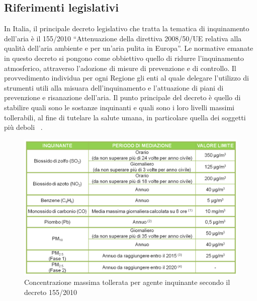 \subsection{Riferimenti legislativi}
In Italia, il principale decreto legislativo che tratta la tematica di inquinamento dell'aria è il 155/2010 “Attenuazione della direttiva 2008/50/UE relativa alla qualità dell'aria ambiente e per un'aria pulita in Europa”.
Le normative emanate in questo decreto si pongono come obbiettivo quello di ridurre l'inquinamento atmosferico, attraverso l'adozione di misure di prevenzione e di controllo.
Il provvedimento individua per ogni Regione gli enti al quale delegare l'utilizzo di strumenti utili alla misuara dell'inquinamento e l'attuazione di piani di prevenzione e risanazione dell'aria.
Il punto principale del decreto è quello di stabilire quali sono le sostanze inquinanti e quali sono i loro livelli massimi tollerabili, al fine di tutelare la salute umana, in particolare quella dei soggetti più deboli ~\cite{arpa_veneto}.
\begin{figure}
  \includegraphics[width=\linewidth]{img/livelli.png}
  \caption{Concentrazione massima tollerata per agente inquinante secondo il decreto 155/2010}
  \label{fig:livelli}
\end{figure}


